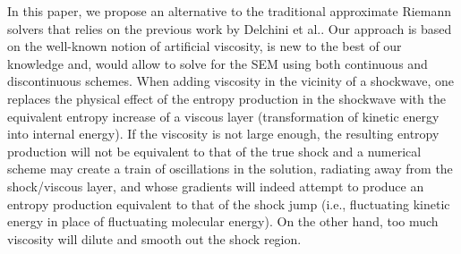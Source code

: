 \documentclass[preprint,10pt]{elsarticle}
\begin{document}
In this paper, we propose an alternative to the traditional approximate Riemann solvers that relies on the previous work by Delchini et al.\cite{Marco_paper_sem}. Our approach is 
based on the well-known notion of artificial viscosity, is new to the best of our knowledge and, would allow to solve for the SEM using both continuous and discontinuous schemes. 
When adding viscosity in the vicinity of a shockwave, one replaces the physical effect of the entropy production in the shockwave with the equivalent entropy increase of a viscous layer (transformation of kinetic energy into internal energy).  
If the viscosity is not large enough, the resulting entropy production will not be equivalent to that of the true shock and a numerical scheme 
may create a train of oscillations in the solution, radiating away from the shock/viscous layer, and whose gradients will indeed attempt to produce 
an entropy production equivalent to that of the shock jump (i.e., fluctuating kinetic energy in place of fluctuating molecular energy). 
On the other hand, too much viscosity will dilute and smooth out the shock region.  
%
%
\end{document}
